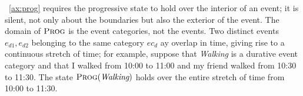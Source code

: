~\ref{ax:prog} requires the progressive state to hold over the interior of an event; it is silent, not
only about the boundaries but also the exterior of the event. The domain of $\textsc{Prog}$ is the event categories, not the events.
Two distinct events $e_{d1}, e_{d2}$ belonging to the same category $ec_d$ ay overlap in time, giving rise to a continuous
stretch of time; for example, suppose that \textit{Walking} is a durative event category and that I walked from 10:00 to 11:00 and
my friend walked from 10:30 to 11:30. The state $\textsc{Prog}(\textit{Walking})$ holds over the entire stretch of time from 10:00 to 11:30.




